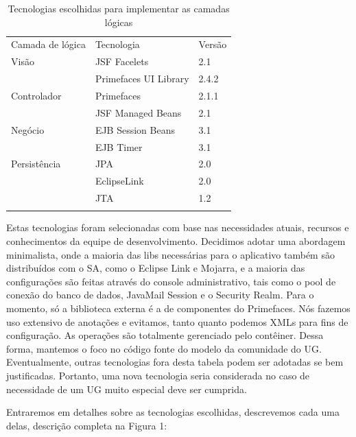 \documentclass[envcountsame,envcountchap]{svmono}
\begin{document}
\begin{table}
\centering
\caption{Tecnologias escolhidas para implementar as camadas lógicas}
\label{tab:chosen-technologies}
\begin{tabular}{lll}
\hline\noalign{\smallskip}
Camada de lógica & Tecnologia & Versão \\
\noalign{\smallskip}\hline\noalign{\smallskip}
Visão & JSF Facelets & 2.1 \\
 & Primefaces UI Library & 2.4.2 \\
\noalign{\smallskip}
Controlador & Primefaces & 2.1.1 \\
 & JSF Managed Beans & 2.1 \\
\noalign{\smallskip}
Negócio & EJB Session Beans & 3.1 \\
 & EJB Timer & 3.1 \\
\noalign{\smallskip}
Persistência & JPA & 2.0 \\
 & EclipseLink & 2.0 \\
 & JTA & 1.2 \\
\noalign{\smallskip}\hline
\end{tabular}
\end{table}

Estas tecnologias foram selecionadas com base nas necessidades atuais, recursos e conhecimentos da equipe de desenvolvimento. Decidimos adotar uma abordagem minimalista, onde a maioria das libs necessárias para o aplicativo também são distribuídos com o SA, como o Eclipse Link e Mojarra, e a maioria das configurações são feitas através do console administrativo, tais como o pool de conexão do banco de dados, JavaMail Session e o Security Realm. Para o momento, só a biblioteca externa é a de componentes do Primefaces. Nós fazemos uso extensivo de anotações e evitamos, tanto quanto podemos XMLs para fins de configuração. As operações são totalmente gerenciado pelo contêiner. Dessa forma, mantemos o foco no código fonte do modelo da comunidade do UG. Eventualmente, outras tecnologias fora desta tabela podem ser adotadas se bem justificadas. Portanto, uma nova tecnologia seria considerada no caso de necessidade de um UG muito especial deve ser cumprida.

Entraremos em detalhes sobre as tecnologias escolhidas, descrevemos cada uma delas, descrição completa na Figura 1:
\end{document}
